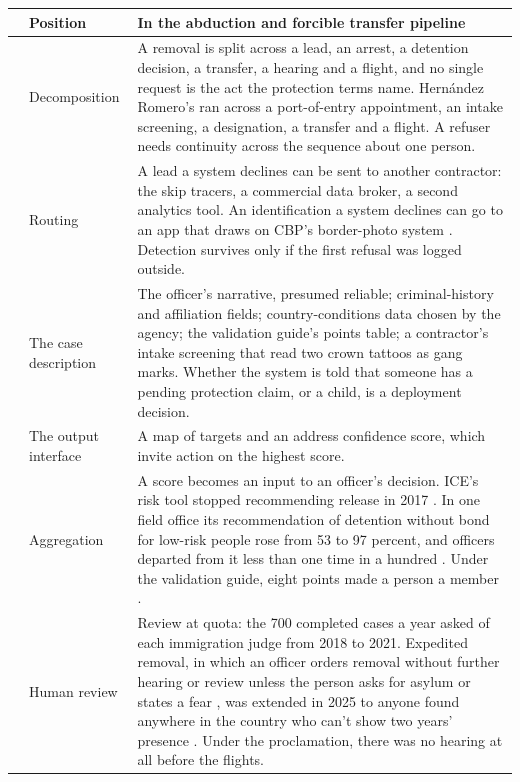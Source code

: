 \begingroup\small\renewcommand{\arraystretch}{1.12}
\begin{longtable}{@{}>{\raggedright\arraybackslash}p{}>{\raggedright\arraybackslash}p{}>{\raggedright\arraybackslash}p{}@{}}
\hline
 & \textbf{Position} & \textbf{In the abduction and forcible transfer pipeline} \\
\hline
\endhead
1 & Decomposition & A removal is split across a lead, an arrest, a detention decision, a transfer, a hearing and a flight, and no single request is the act the protection terms name. Hernández Romero's ran across a port-of-entry appointment, an intake screening, a designation, a transfer and a flight. A refuser needs continuity across the sequence about one person. \\ \hline
2 & Routing & A lead a system declines can be sent to another contractor: the skip tracers, a commercial data broker, a second analytics tool. An identification a system declines can go to an app that draws on CBP's border-photo system \autocite{Cox2025MobileFortify}. Detection survives only if the first refusal was logged outside. \\ \hline
3 & The case description & The officer's narrative, presumed reliable; criminal-history and affiliation fields; country-conditions data chosen by the agency; the validation guide's points table; a contractor's intake screening that read two crown tattoos as gang marks. Whether the system is told that someone has a pending protection claim, or a child, is a deployment decision. \\ \hline
4 & The output interface & A map of targets and an address confidence score, which invite action on the highest score. \\ \hline
5 & Aggregation & A score becomes an input to an officer's decision. ICE's risk tool stopped recommending release in 2017 \autocite{Tashea2018RCA,nyclu2018rca}. In one field office its recommendation of detention without bond for low-risk people rose from 53 to 97 percent, and officers departed from it less than one time in a hundred \autocite{Biddle2020RCA}. Under the validation guide, eight points made a person a member \autocite{MartinezBeltran2025Validation}. \\ \hline
6 & Human review & Review at quota: the 700 completed cases a year asked of each immigration judge from 2018 to 2021. Expedited removal, in which an officer orders removal without further hearing or review unless the person asks for asylum or states a fear \autocite{usc1225}, was extended in 2025 to anyone found anywhere in the country who can't show two years' presence \autocite{dhs2025expeditedremoval}. Under the proclamation, there was no hearing at all before the flights. \\ \hline

\end{longtable}
